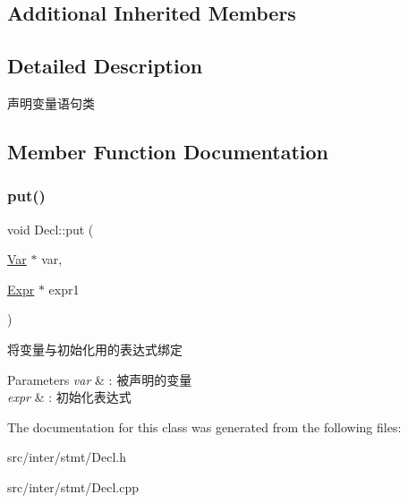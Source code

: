 \subsection*{Additional Inherited Members}


\subsection{Detailed Description}
声明变量语句类 

\subsection{Member Function Documentation}
\mbox{\label{class_decl_a4c91db9c289b90f3045783f6bf53a688}} 
\subsubsection{\texorpdfstring{put()}{put()}}
{\footnotesize\ttfamily void Decl\+::put (\begin{DoxyParamCaption}\item[{\hyperlink{class_var}{Var} $\ast$}]{var,  }\item[{\hyperlink{class_expr}{Expr} $\ast$}]{expr1 }\end{DoxyParamCaption})}

将变量与初始化用的表达式绑定 
\begin{DoxyParams}{Parameters}
{\em var} & \+: 被声明的变量 \\
\hline
{\em expr} & \+: 初始化表达式 \\
\hline
\end{DoxyParams}


The documentation for this class was generated from the following files\+:\begin{DoxyCompactItemize}
\item 
src/inter/stmt/Decl.\+h\item 
src/inter/stmt/Decl.\+cpp\end{DoxyCompactItemize}
